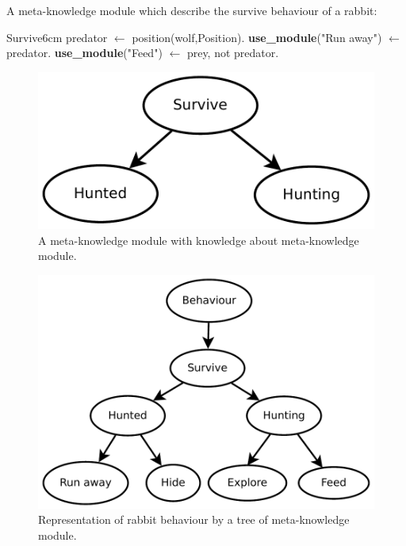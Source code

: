 \documentclass{aamas2012}
\begin{document}
	\begin{example}
		\label{survive_example}
		A meta-knowledge module which describe the survive behaviour of a rabbit:\newline
		\begin{module}{Survive}{6cm}
			predator $\leftarrow$ position(wolf,Position).\newline
			\textbf{use\_module}("Run away") $\leftarrow$ predator.\newline
			\textbf{use\_module}("Feed") $\leftarrow$ prey, not predator.
		\end{module}
	\end{example}
	
	\begin{figure}
		\centering
		\includegraphics[keepaspectratio=true, scale=0.4]{survive.pdf}
		\caption
		{
			\label{survive_figure}
			A meta-knowledge module with knowledge about meta-knowledge module.
		}
	\end{figure}
	
	\begin{figure}
		\centering
		\includegraphics[keepaspectratio=true, scale=0.5]{behaviour_tree.pdf}
		\caption
		{
			\label{behaviour_tree}
			Representation of rabbit behaviour by a tree of meta-knowledge module.
		}
	\end{figure}
	
\end{document}
